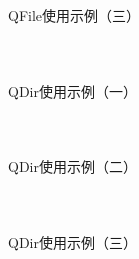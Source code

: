 \documentclass[UTF8,aspectratio=169]{beamer}
\begin{document}
\begin{frame}[fragile]{QFile使用示例（三）}
    \begin{columns}
        \begin{column}{0.48\textwidth}
            \inputminted[firstline=68,lastline=81]{cpp}{code/qt_file_example.cpp}
        \end{column}
        \begin{column}{0.48\textwidth}
            \inputminted[firstline=82,lastline=93]{cpp}{code/qt_file_example.cpp}
        \end{column}
    \end{columns}

\end{frame}

\begin{frame}[fragile]{QDir使用示例（一）}
    \begin{columns}
        \begin{column}{0.48\textwidth}
            \inputminted[firstline=1,lastline=16]{cpp}{code/qt_dir_example.cpp}
        \end{column}
        \begin{column}{0.48\textwidth}
            \inputminted[firstline=17,lastline=34]{cpp}{code/qt_dir_example.cpp}
        \end{column}
    \end{columns}
\end{frame}

\begin{frame}[fragile]{QDir使用示例（二）}
    \begin{columns}
        \begin{column}{0.48\textwidth}
            \inputminted[firstline=35,lastline=53]{cpp}{code/qt_dir_example.cpp}
        \end{column}
        \begin{column}{0.48\textwidth}
            \inputminted[firstline=54,lastline=71]{cpp}{code/qt_dir_example.cpp}
        \end{column}
    \end{columns}
\end{frame}

\begin{frame}[fragile]{QDir使用示例（三）}
    \begin{columns}
        \begin{column}{0.48\textwidth}
            \inputminted[firstline=72,lastline=85]{cpp}{code/qt_dir_example.cpp}
        \end{column}
        \begin{column}{0.48\textwidth}
            \inputminted[firstline=86,lastline=98]{cpp}{code/qt_dir_example.cpp}
        \end{column}
    \end{columns}
\end{frame}
\end{document}

